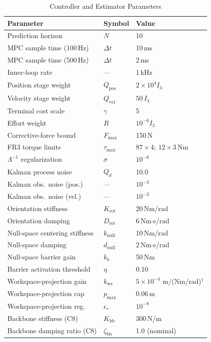 \documentclass[journal]{IEEEtran}
\begin{document}
\begin{table}[!t]
\caption{Controller and Estimator Parameters}
\label{tab:params}
\renewcommand{\arraystretch}{1.0}
\footnotesize
\setlength{\tabcolsep}{3pt}
\begin{tabular}{p{2.3cm}p{1.2cm}p{2.5cm}}
\toprule
\textbf{Parameter} & \textbf{Symbol} & \textbf{Value}\\
\midrule
Prediction horizon & $N$ & 10\\
MPC sample time (100\,Hz) & $\Delta t$ & 10\,ms\\
MPC sample time (500\,Hz) & $\Delta t$ & 2\,ms\\
Inner-loop rate & --- & 1\,kHz\\
Position stage weight & $Q_\text{pos}$ & $2\times10^4 I_3$\\
Velocity stage weight & $Q_\text{vel}$ & $50\,I_3$\\
Terminal cost scale & $\gamma$ & 5\\
Effort weight & $R$ & $10^{-6}I_3$\\
Corrective-force bound & $F_\text{max}$ & 150\,N\\
FR3 torque limits & $\tau_\text{max}$ & $87\!\times\!4;\ 12\!\times\!3$\,Nm\\
$\Lambda^{-1}$ regularization & $\sigma$ & $10^{-6}$\\
Kalman process noise & $Q_d$ & 10.0\\
Kalman obs.\ noise (pos.) & --- & $10^{-3}$\\
Kalman obs.\ noise (vel.) & --- & $10^{-2}$\\
Orientation stiffness & $K_\text{rot}$ & 20\,Nm/rad\\
Orientation damping & $D_\text{rot}$ & 6\,Nm$\cdot$s/rad\\
Null-space centering stiffness & $k_\text{null}$ & 10\,Nm/rad\\
Null-space damping & $d_\text{null}$ & 2\,Nm$\cdot$s/rad\\
Null-space barrier gain & $k_b$ & 50\,Nm\\
Barrier activation threshold & $\eta$ & 0.10\\
Workspace-projection gain & $k_\text{ws}$ & $5\times10^{-4}$ m/(Nm/rad)$^\dagger$\\
Workspace-projection cap & $p_\text{max}$ & 0.06\,m\\
Workspace-projection reg. & $\epsilon_r$ & $10^{-8}$\\
Backbone stiffness (C8) & $K_\text{bb}$ & 300\,N/m\\
Backbone damping ratio (C8) & $\zeta_\text{bb}$ & 1.0 (nominal)\\

\end{tabular}
\end{table}
\end{document}
